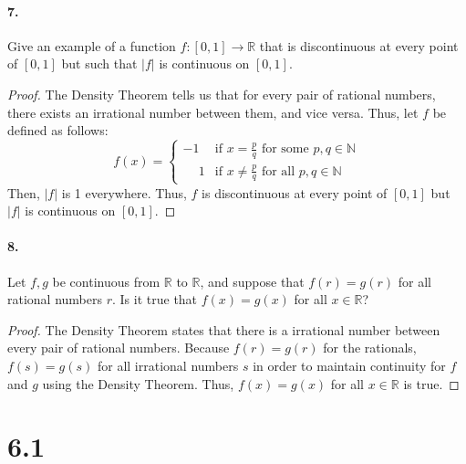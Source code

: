 \documentclass[12pt]{article}
\theoremstyle{remark}
\begin{document}
\paragraph{7.} Give an example of a function $f:[0,1] \rightarrow \mathbb{R}$ that is discontinuous at every point of $[0,1]$ but such that $|f|$ is continuous on $[0,1]$.
\begin{proof}
    The Density Theorem tells us that for every pair of rational numbers, there exists an irrational number between them, and vice versa. Thus, let $f$ be defined as follows:
    $$f(x) = \begin{cases}
        -1 & \text{if } x = \frac{p}{q} \text{ for some } p, q \in \mathbb{N} \\
        \phantom{-}1 & \text{if } x \neq \frac{p}{q} \text{ for all } p, q \in \mathbb{N}
    \end{cases}$$
    Then, $|f|$ is 1 everywhere. Thus, $f$ is discontinuous at every point of $[0,1]$ but $|f|$ is continuous on $[0,1]$.
\end{proof}

\paragraph{8.} Let $f, g$ be continuous from $\mathbb{R}$ to $\mathbb{R}$, and suppose that $f(r)=g(r)$ for all rational numbers $r$. Is it true that $f(x)=g(x)$ for all $x \in \mathbb{R}$?
\begin{proof}
    The Density Theorem states that there is a irrational number between every pair of rational numbers. Because $f(r) = g(r)$ for the rationals, $f(s) = g(s)$ for all irrational numbers $s$ in order to maintain continuity for $f$ and $g$ using the Density Theorem. Thus, $f(x) = g(x)$ for all $x \in \mathbb{R}$ is true.
\end{proof}

\section*{6.1}
\end{document}

